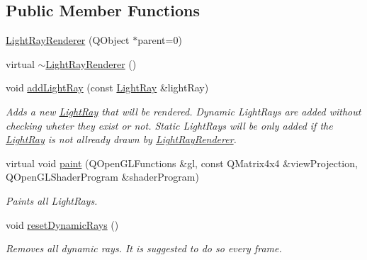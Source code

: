 \subsection*{Public Member Functions}
\begin{DoxyCompactItemize}
\item 
\hyperlink{class_light_ray_renderer_a081e83e5e16a36faec002878052aab04}{Light\+Ray\+Renderer} (Q\+Object $\ast$parent=0)
\item 
virtual \hyperlink{class_light_ray_renderer_ac751be83a9d351286b0f89693c425205}{$\sim$\+Light\+Ray\+Renderer} ()
\item 
void \hyperlink{class_light_ray_renderer_a0e481c5c466f2423e06adfde398f6a28}{add\+Light\+Ray} (const \hyperlink{class_light_ray}{Light\+Ray} \&light\+Ray)
\begin{DoxyCompactList}\small\item\em Adds a new \hyperlink{class_light_ray}{Light\+Ray} that will be rendered.  Dynamic Light\+Rays are added without checking wheter they exist or not. Static Light\+Rays will be only added if the \hyperlink{class_light_ray}{Light\+Ray} is not allready drawn by \hyperlink{class_light_ray_renderer}{Light\+Ray\+Renderer}. \end{DoxyCompactList}\item 
virtual void \hyperlink{class_light_ray_renderer_a3270c30bd4f5eba01e543bb196c501ed}{paint} (Q\+Open\+G\+L\+Functions \&gl, const Q\+Matrix4x4 \&view\+Projection, Q\+Open\+G\+L\+Shader\+Program \&shader\+Program)
\begin{DoxyCompactList}\small\item\em Paints all Light\+Rays. \end{DoxyCompactList}\item 
void \hyperlink{class_light_ray_renderer_a6274b441ae15e56176d1d4d7d86ed540}{reset\+Dynamic\+Rays} ()
\begin{DoxyCompactList}\small\item\em Removes all dynamic rays. It is suggested to do so every frame. \end{DoxyCompactList}\end{DoxyCompactItemize}
